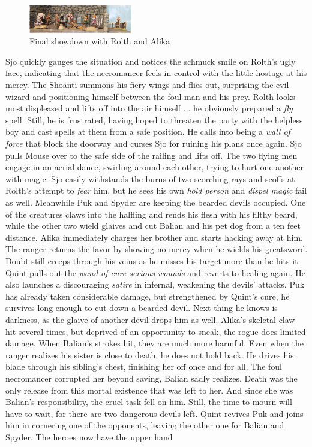 \begin{figure}[h]
	\centering
	\includegraphics[width=0.4\textwidth]{images/Final-showdown-with-Rolth-and-Alika-559765837_mod.jpg}
	\caption{Final showdown with Rolth and Alika}
	\label{fig:Final-showdown-with-Rolth-and-Alika-559765837}
\end{figure}

Sjo quickly gauges the situation and notices the schmuck smile on Rolth's ugly face, indicating that the necromancer feels in control with the little hostage at his mercy. The Shoanti summons his fiery wings and flies out, surprising the evil wizard and positioning himself between the foul man and his prey. Rolth looks most displeased and lifts off into the air himself ... he obviously prepared a {\itshape fly} spell. Still, he is frustrated, having hoped to threaten the party with the helpless boy and cast spells at them from a safe position. He calls into being a  {\itshape wall of force} that block the doorway and curses Sjo for ruining his plans once again. Sjo pulls Mouse over to the safe side of the railing and lifts off. The two flying men engage in an aerial dance, swirling around each other, trying to hurt one another with magic. Sjo easily withstands the burns of two scorching rays and scoffs at Rolth's attempt to  {\itshape fear} him, but he sees his own  {\itshape hold person} and  {\itshape dispel magic} fail as well. Meanwhile Puk and Spyder are keeping the bearded devils occupied. One of the creatures claws into the halfling and rends his flesh with his filthy beard, while the other two wield glaives and cut Balian and his pet dog from a ten feet distance. Alika immediately charges her brother and starts hacking away at him. The ranger returns the favor by showing no mercy when he wields his greatsword. Doubt still creeps through his veins as he misses his target more than he hits it. Quint pulls out the {\itshape wand of cure serious wounds} and reverts to healing again. He also launches a discouraging  {\itshape satire} in infernal, weakening the devils' attacks. Puk has already taken considerable damage, but strengthened by Quint's cure, he survives long enough to cut down a bearded devil. Next thing he knows is darkness, as the glaive of another devil drops him as well. Alika's skeletal claw hit several times, but deprived of an opportunity to sneak, the rogue does limited damage. When Balian's strokes hit, they are much more harmful. Even when the ranger realizes his sister is close to death, he does not hold back. He drives his blade through his sibling's chest, finishing her off once and for all. The foul necromancer corrupted her beyond saving, Balian sadly realizes. Death was the only release from this mortal existence that was left to her. And since she was Balian's responsibility, the cruel task fell on him. Still, the time to mourn will have to wait, for there are two dangerous devils left. Quint revives Puk and joins him in cornering one of the opponents, leaving the other one for Balian and Spyder. The heroes now have the upper hand 
